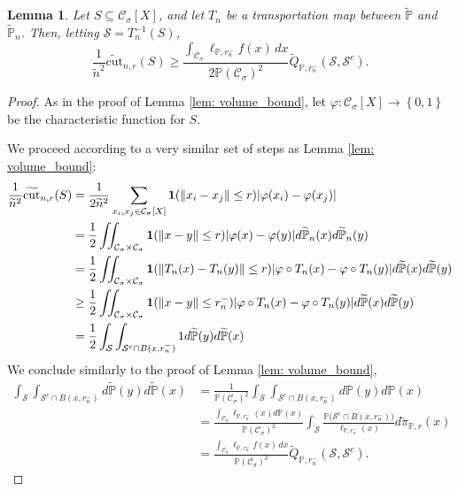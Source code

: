 \documentclass[11pt,twoside]{article}
\newtheorem{lemma}{Lemma}
\DeclarePairedDelimiter\abs{\lvert}{\rvert}
\newcommand{\set}[1]{\left\{#1\right\}}
\newcommand{\cut}{\mathrm{cut}}
\newcommand{\norm}[1]{\left\lVert#1\right\rVert}
\newcommand{\1}{\mathbf{1}}
\newcommand{\Xbf}{X}             %
\newcommand{\Pbb}{\mathbb{P}}
\newcommand{\Sset}{\mathcal{S}}
\newcommand{\Cset}{\mathcal{C}}
\newcommand{\Csig}{\Cset_{\sigma}}
\newcommand{\dx}{\,dx}
\newcommand{\piwt}{\widetilde{\pi}}
\begin{document}
\begin{lemma}
	\label{lem: cut_bound}
	Let $S \subseteq \Csig[\Xbf]$, and let $T_n$ be a transportation map between $\widetilde{\Pbb}$ and $\widetilde{\Pbb}_n$. Then, letting $\Sset = T_n^{-1}(S)$,
	\begin{equation*}
	\frac{1}{\widetilde{n}^2} \widetilde{\cut}_{n,r}(S) \geq \frac{\int_{\Csig} \ell_{\Pbb,r_n^-}f(x) \dx}{2 \Pbb(\Csig)^2} \widetilde{Q}_{\Pbb,r_n^-}(\Sset, \Sset^c).
	\end{equation*}
\end{lemma}
\begin{proof}
	As in the proof of Lemma \ref{lem: volume_bound}, let $\varphi: \Csig[\Xbf] \to \set{0,1}$ be the characteristic function for $S$.
	
	We proceed according to a very similar set of steps as Lemma \ref{lem: volume_bound}:
	\begin{align*}
	\frac{1}{\widetilde{n}^2} \widetilde{\cut}_{n,r}(S) & = \frac{1}{2 \widetilde{n}^2} \sum_{x_i, x_j \in \Csig[\Xbf]} \1(\norm{x_i - x_j} \leq r) \abs{\varphi(x_i) - \varphi(x_j)} \\
	& = \frac{1}{2}\iint_{\Csig \times \Csig} \1(\norm{x - y} \leq r) \abs{\varphi(x) - \varphi(y)} d\widetilde{\Pbb}_n(x) d\widetilde{\Pbb}_n(y) \\
	& =  \frac{1}{2}\iint_{\Csig \times \Csig} \1(\norm{T_n(x) - T_n(y)} \leq r) \abs{\varphi \circ T_n(x) - \varphi \circ T_n(y)} d\widetilde{\Pbb}(x) d\widetilde{\Pbb}(y) \\
	& \geq \frac{1}{2} \iint_{\Csig \times \Csig} \1(\norm{x - y} \leq r_n^-) \abs{\varphi \circ T_n(x) - \varphi \circ T_n(y)} d\widetilde{\Pbb}(x) d\widetilde{\Pbb}(y) \\
	& = \frac{1}{2} \int_{\Sset} \int_{\Sset^c \cap B(x,r_n^-)} 1 d\widetilde{\Pbb}(y) d\widetilde{\Pbb}(x)
	\end{align*}
	We conclude similarly to the proof of Lemma \ref{lem: volume_bound},
	\begin{align*}
	\int_{\Sset} \int_{\Sset^c \cap B(x,r_n^-)} d\widetilde{\Pbb}(y) d\widetilde{\Pbb}(x) & = \frac{1}{\Pbb(\Csig)^2} \int_{\Sset} \int_{\Sset^c \cap B(x,r_n^-)} d\Pbb(y) d\Pbb(x) \\
	& = \frac{\int_{\Csig} \ell_{\Pbb,r_n^-}(x) d\Pbb(x)}{\Pbb(\Csig)^2} \int_{\Sset} \frac{\Pbb\bigl(\Sset^c \cap B(x,r_n^-)\bigr)}{\ell_{\Pbb,r_n^-}(x)} d\piwt_{\Pbb,r}(x) \\
	& = \frac{\int_{\Csig} \ell_{\Pbb,r_n^-}f(x) \dx}{\Pbb(\Csig)^2} \widetilde{Q}_{\Pbb,r_n^-}(\Sset, \Sset^c).
	\end{align*}	
\end{proof}
\end{document}
